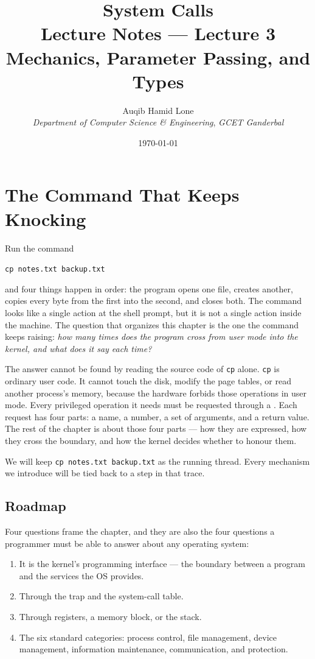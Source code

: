 \documentclass[11pt]{article}
\title{System Calls\\\large Lecture Notes --- Lecture 3\\
  \normalsize Mechanics, Parameter Passing, and Types}
\author{Auqib Hamid Lone\\[0.3em]
  \emph{Department of Computer Science \& Engineering}, \emph{GCET Ganderbal}}
\date{\today}
\begin{document}
\maketitle

\section{The Command That Keeps Knocking}

Run the command

\begin{center}
\texttt{cp notes.txt backup.txt}
\end{center}

\noindent
and four things happen in order: the program opens one file, creates another,
copies every byte from the first into the second, and closes both. The command
looks like a single action at the shell prompt, but it is not a single action
inside the machine. The question that organizes this chapter is the one the
command keeps raising: \emph{how many times does the program cross from user
mode into the kernel, and what does it say each time?}

The answer cannot be found by reading the source code of \texttt{cp} alone.
\texttt{cp} is ordinary user code. It cannot touch the disk, modify the page
tables, or read another process's memory, because the hardware forbids those
operations in user mode. Every privileged operation it needs must be requested
through a . Each request has four parts: a name, a number, a
set of arguments, and a return value. The rest of the chapter is about those
four parts --- how they are expressed, how they cross the boundary, and how the
kernel decides whether to honour them.

We will keep \texttt{cp notes.txt backup.txt} as the running thread. Every
mechanism we introduce will be tied back to a step in that trace.

\subsection*{Roadmap}

Four questions frame the chapter, and they are also the four questions a
programmer must be able to answer about any operating system:

\begin{enumerate}
  \item {} It is the kernel's programming interface
        --- the boundary between a program and the services the OS provides.
  \item {} Through the trap and the
        system-call table.
  \item {} Through registers, a memory block, or
        the stack.
  \item {} The six standard categories:
        process control, file management, device management, information
        maintenance, communication, and protection.
\end{enumerate}
\end{document}
